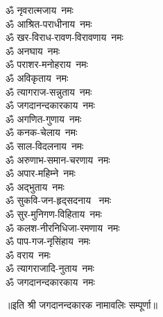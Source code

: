 \begin{flushleft}
\begin{multicols}{2}
ॐ नृवरात्मजाय~नमः\hfill{}\\
ॐ आश्रित-पराधीनाय~नमः\\
ॐ खर-विराध-रावण-विरावणाय~नमः\\
ॐ अनघाय~नमः\\
ॐ पराशर-मनोहराय~नमः\\
ॐ अविकृताय~नमः\\
ॐ त्यागराज-सन्नुताय~नमः\\
ॐ जगदानन्दकारकाय~नमः\\
ॐ अगणित-गुणाय~नमः\\
ॐ कनक-चेलाय~नमः\\
ॐ साल-विदलनाय~नमः\hfill{}\\
ॐ अरुणाभ-समान-चरणाय~नमः\\
ॐ अपार-महिम्ने~नमः\\
ॐ अद्भुताय~नमः\\
ॐ सुकवि-जन-हृद्सदनाय ~नमः\\
ॐ सुर-मुनिगण-विहिताय~नमः\\
ॐ कलश-नीरनिधिजा-रमणाय~नमः\\
ॐ पाप-गज-नृसिंहाय~नमः\\
ॐ वराय~नमः\\
ॐ त्यागराजादि-नुताय~नमः\\
ॐ जगदानन्दकारकाय~नमः\hfill{}\\
\end{multicols}
\end{flushleft}
\centerline{॥इति श्री जगदानन्दकारक नामावलिः सम्पूर्णा॥}
